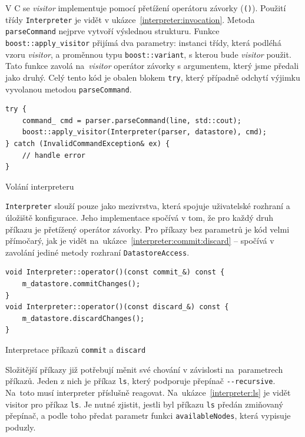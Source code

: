 \documentclass[thesis=B,czech,hidelinks]{FITthesis}[2019/03/06]
\newcommand{\Rplus}{\protect\hspace{-.1em}\protect\raisebox{.35ex}{\smaller{\smaller\textbf{+}}}}
\newcommand{\Cpp}{\mbox{C\Rplus\Rplus}\xspace}
\begin{document}
V \Cpp{} se \textit{visitor} implementuje pomocí přetížení operátoru závorky (\texttt{()}). Použití třídy \texttt{Interpreter} je vidět v ukázce~\ref{interpreter:invocation}. Metoda \texttt{parseCommand} nejprve vytvoří výslednou strukturu. Funkce \texttt{boost::apply\_visitor} přijímá dva parametry: instanci třídy, která podléhá vzoru \textit{visitor}, a proměnnou typu \texttt{boost::variant}, s kterou bude \textit{visitor} použit. Tato funkce zavolá na~\textit{visitor} operátor závorky s argumentem, který jsme předali jako druhý. Celý tento kód je obalen blokem \texttt{try}, který případně odchytí výjimku vyvolanou metodou \texttt{parseCommand}.

\begin{listing}[H]
\begin{verbatim}
try {
    command_ cmd = parser.parseCommand(line, std::cout);
    boost::apply_visitor(Interpreter(parser, datastore), cmd);
} catch (InvalidCommandException& ex) {
    // handle error
}
\end{verbatim}
\caption{Volání interpreteru}\label{interpreter:invocation}
\end{listing}

\texttt{Interpreter} slouží pouze jako mezivrstva, která spojuje uživatelské rozhraní a úložiště konfigurace. Jeho implementace spočívá v tom, že pro každý druh příkazu je přetížený operátor závorky. Pro příkazy bez parametrů je kód velmi přímočarý, jak je vidět na~ukázce~\ref{interpreter:commit:discard} -- spočívá v zavolání jediné metody rozhraní \texttt{DatastoreAccess}.

\begin{listing}[H]
\begin{verbatim}
void Interpreter::operator()(const commit_&) const {
    m_datastore.commitChanges();
}
void Interpreter::operator()(const discard_&) const {
    m_datastore.discardChanges();
}
\end{verbatim}
\caption{Interpretace příkazů \texttt{commit} a \texttt{discard}}\label{interpreter:commit:discard}
\end{listing}

Složitější příkazy již potřebují měnit své chování v závislosti na~parametrech příkazů. Jeden z nich je příkaz \texttt{ls}, který podporuje přepínač \verb¨--recursive¨. Na~toto musí interpreter příslušně reagovat. Na~ukázce~\ref{interpreter:ls} je vidět visitor pro příkaz \texttt{ls}. Je nutné zjistit, jestli byl příkazu \texttt{ls} předán zmiňovaný přepínač, a podle toho předat parametr funkci \texttt{availableNodes}, která vypisuje poduzly.
\end{document}
